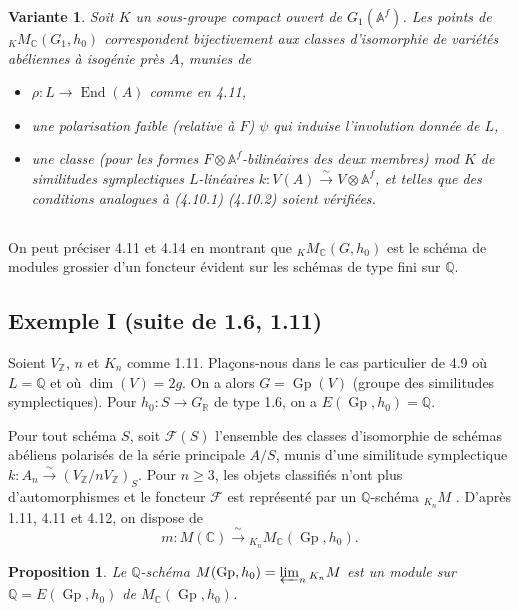 \documentclass[11pt]{amsart}
\theoremstyle{plain}
\newtheorem{proposition}[theorem]{Proposition}
\newtheorem{variante}{Variante}
\theoremstyle{definition}
\DeclareMathOperator{\End}{End}
\DeclareMathOperator{\Gp}{Gp}
\newcommand{\ZZ}{\mathbb{Z}}
\newcommand{\QQ}{\mathbb{Q}}
\newcommand{\RR}{\mathbb{R}}
\newcommand{\CC}{\mathbb{C}}
\newcommand{\AAf}{\mathbb{A}^f}
\newcommand{\MC}{M_{\mathbb{C}}}
\begin{document}
\begin{variante}
Soit $K$ un sous-groupe compact ouvert de $G_1(\AAf)$. Les points de ${}_K \MC(G_1, h_0)$ correspondent bijectivement aux classes d'isomorphie de vari\'et\'es ab\'eliennes \`a isog\'enie pr\`es $A$, munies de
\begin{itemize}
\item[(a)] $\rho : L \to \End(A)$ comme en 4.11,
\item[(b)] une polarisation faible (relative \`a $F$) $\psi$ qui induise l'involution donn\'ee de $L$,
\item[(c)] une classe (pour les formes $F \otimes \AAf$-bilin\'eaires des deux membres) mod $K$ de similitudes symplectiques $L$-lin\'eaires $k : V(A) \xrightarrow{\sim} V \otimes \AAf$, et telles que des conditions analogues \`a (4.10.1) (4.10.2) soient v\'erifi\'ees.
\end{itemize}
\end{variante}

\subsection{}

On peut pr\'eciser 4.11 et 4.14 en montrant que ${}_K \MC(G, h_0)$ est le sch\'ema de modules grossier d'un foncteur \'evident sur les sch\'emas de type fini sur $\QQ$.

\subsection{Exemple I (suite de 1.6, 1.11)}

Soient $V_{\ZZ}$, $n$ et $K_n$ comme 1.11. Pla\c cons-nous dans le cas particulier de 4.9 o\`u $L = \QQ$ et o\`u $\dim(V) = 2g$. On a alors $G = \Gp(V)$ (groupe des similitudes symplectiques). Pour $h_0 : S \to G_{\RR}$ de type 1.6, on a $E(\Gp, h_0) = \QQ$.

Pour tout sch\'ema $S$, soit $\mathcal{F}(S)$ l'ensemble des classes d'isomorphie de sch\'emas ab\'eliens polaris\'es de la s\'erie principale $A/S$, munis d'une similitude symplectique $k : A_n \xrightarrow{\sim} (V_{\ZZ}/nV_{\ZZ})_S$. Pour $n \geq 3$, les objets classifi\'es n'ont plus d'automorphismes et le foncteur $\mathcal{F}$ est repr\'esent\'e par un $\QQ$-sch\'ema ${}_{K_n} M$ \cite{Mu1}. D'apr\`es 1.11, 4.11 et 4.12, on dispose de
\[
m : M(\CC) \xrightarrow{\;\sim\;} {}_{K_n} \MC(\Gp, h_0).
\]

\begin{proposition}
Le $\QQ$-sch\'ema $M(\Gp, h_0) = \varprojlim_n {}_{K_n} M$ est un module sur $\QQ = E(\Gp, h_0)$ de $\MC(\Gp, h_0)$.
\end{proposition}
\end{document}
